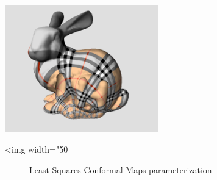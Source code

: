 \begin{center}
    \label{parameterization-fig-introduction}
    \begin{ccTexOnly}
        \includegraphics[width=0.5\textwidth]{Parameterization/introduction} %
    \end{ccTexOnly}
    \begin{ccHtmlOnly}
        <img width="50%
    \end{ccHtmlOnly}
    \begin{figure}[h]
        \caption{Least Squares Conformal Maps parameterization}
    \end{figure}
\end{center}


